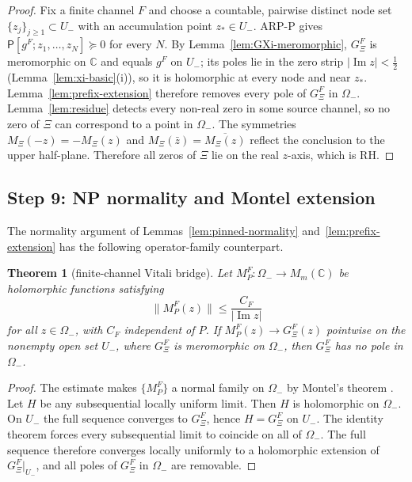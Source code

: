 \documentclass[11pt]{amsart}
\newtheorem{theorem}{Theorem}[section]
\theoremstyle{definition}
\theoremstyle{remark}
\theoremstyle{definition}
\renewcommand{\Im}{\operatorname{Im}}
\newcommand{\half}{\tfrac{1}{2}}
\newcommand{\C}{\mathbb{C}}
\newcommand{\GXi}{G_\Xi}
\begin{document}
\begin{proof}
Fix a finite channel $F$ and choose a countable, pairwise distinct node set
$\{z_j\}_{j\ge1}\subset U_-$ with an accumulation point $z_*\in U_-$.  ARP-P gives
$\mathsf P[g^F;z_1,\ldots,z_N]\succeq0$ for every $N$.  By Lemma~\ref{lem:GXi-meromorphic}, $\GXi^F$ is
meromorphic on $\C$ and equals $g^F$ on $U_-$; its poles lie in the zero strip $|\Im z|<\half$
(Lemma~\ref{lem:xi-basic}(i)), so it is holomorphic at every node and near $z_*$.
Lemma~\ref{lem:prefix-extension} therefore removes every pole of $\GXi^F$ in $\Omega_-$.
Lemma~\ref{lem:residue} detects every non-real zero in some source
channel, so no zero of $\Xi$ can correspond to a point in $\Omega_-$.  The symmetries
$M_\Xi(-z)=-M_\Xi(z)$ and $M_\Xi(\bar z)=\overline{M_\Xi(z)}$ reflect the conclusion to the upper
half-plane.  Therefore all zeros of $\Xi$ lie on the real $z$-axis, which is RH.
\end{proof}

\subsection{Step 9: NP normality and Montel extension}

The normality argument of Lemmas~\ref{lem:pinned-normality} and~\ref{lem:prefix-extension} has the
following operator-family counterpart.

\begin{theorem}[finite-channel Vitali bridge]\label{thm:vitali}
Let $M_P^F:\Omega_-\to M_m(\C)$ be holomorphic functions satisfying
\[
   \|M_P^F(z)\|\le \frac{C_F}{|\Im z|}
\]
for all $z\in\Omega_-$, with $C_F$ independent of $P$.  If $M_P^F(z)\to\GXi^F(z)$ pointwise on the nonempty open set $U_-$, where
$\GXi^F$ is meromorphic on $\Omega_-$, then $\GXi^F$ has no pole in $\Omega_-$.
\end{theorem}

\begin{proof}
The estimate makes $\{M_P^F\}$ a normal family on $\Omega_-$ by Montel's theorem \cite{Remmert}.  Let $H$ be any subsequential
locally uniform limit.  Then $H$ is holomorphic on $\Omega_-$.  On $U_-$ the full sequence converges to
$\GXi^F$, hence $H=\GXi^F$ on $U_-$.  The identity theorem forces every subsequential limit to coincide on
all of $\Omega_-$.  The full sequence therefore converges locally uniformly to a holomorphic extension of
$\GXi^F|_{U_-}$, and all poles of $\GXi^F$ in $\Omega_-$ are removable.
\end{proof}
\end{document}
